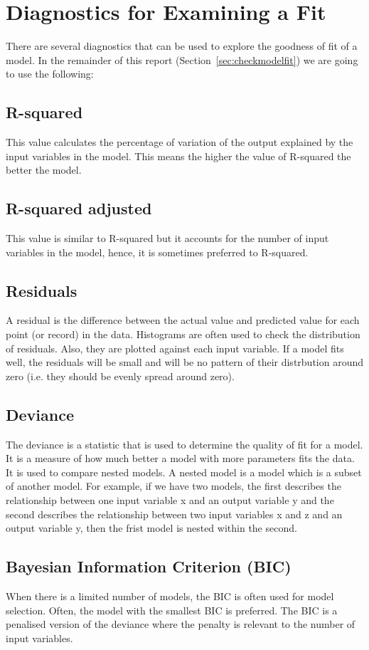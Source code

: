\documentclass[a4paper,12pt, english]{article}
\begin{document}
\section{Diagnostics for Examining a Fit}\label{sec:examine-fit}
There are several diagnostics that can be used to explore the goodness of fit of a model. In the remainder of this report (Section~\ref{sec:checkmodelfit}) we are going to use the following:
\subsection{R-squared}\label{sec:r2}
This value calculates the percentage of variation of the output explained by the input variables in the model. This means the higher the value of R-squared the better the model. 
\subsection{R-squared adjusted}\label{sec:adj-r2}
This value is similar to R-squared but it accounts for the number of input variables in the model, hence, it is sometimes preferred to R-squared.
\subsection{Residuals}\label{sec:residuals}
A residual is the difference between the actual value and predicted value for each point (or record) in the data. Histograms are often used to check the distribution of residuals. Also, they are plotted against each input variable. If a model fits well, the residuals will be small and will be no pattern of their distrbution around zero (i.e. they should be evenly spread around zero).
\subsection{Deviance}\label{sec:dev}
The deviance is a statistic that is used to determine the quality of fit for a model. It is a measure of how much better a model with more parameters fits the data. It is used to compare nested models. A nested model is a model which is a subset of another model. For example, if we have two models, the first describes the relationship between one input variable x and an output variable y and the second describes the relationship between two input variables x and z and an output variable y, then the frist model is nested within the second.

\subsection{Bayesian Information Criterion (BIC)}\label{sec:bic}
When there is a limited number of models, the BIC is often used for model selection. Often, the model with the smallest BIC is preferred. The BIC is a penalised version of the deviance where the penalty is relevant to the number of input variables.
\end{document}
